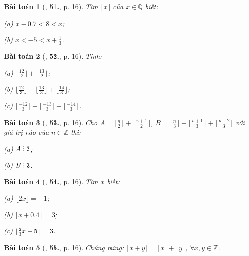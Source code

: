\documentclass{article}
\numberwithin{equation}{section}
\newtheorem{baitoan}{Bài toán}[section]
\DeclareRobustCommand{\divby}{%
	\mathrel{\vbox{\baselineskip.65ex\lineskiplimit0pt\hbox{.}\hbox{.}\hbox{.}}}%
}
\begin{document}
\begin{baitoan}[\cite{Tuyen_Toan_7}, \textbf{51.}, p. 16]
	Tìm $\lfloor x\rfloor$ của $x\in\mathbb{Q}$ biết:
	\begin{enumerate*}
		\item[(a)] $x - 0.7 < 8 < x$;
		\item[(b)] $x < -5 < x + \frac{1}{3}$.
	\end{enumerate*}
\end{baitoan}

\begin{baitoan}[\cite{Tuyen_Toan_7}, \textbf{52.}, p. 16]
	Tính:
	\begin{enumerate*}
		\item[(a)] $\lfloor\frac{12}{2}\rfloor + \lfloor\frac{13}{2}\rfloor$;
		\item[(b)] $\lfloor\frac{12}{3}\rfloor + \lfloor\frac{13}{3}\rfloor + \lfloor\frac{14}{3}\rfloor$;
		\item[(c)] $\lfloor\frac{-12}{3}\rfloor + \lfloor\frac{-13}{3}\rfloor + \lfloor\frac{-14}{3}\rfloor$.
	\end{enumerate*}
\end{baitoan}

\begin{baitoan}[\cite{Tuyen_Toan_7}, \textbf{53.}, p. 16]
	Cho $A = \lfloor\frac{n}{2}\rfloor + \lfloor\frac{n + 1}{2}\rfloor$, $B = \lfloor\frac{n}{3}\rfloor + \lfloor\frac{n + 1}{3}\rfloor + \lfloor\frac{n + 2}{3}\rfloor$ với giá trị nào của $n\in\mathbb{Z}$ thì:
	\begin{enumerate*}
		\item[(a)] $A\divby 2$;
		\item[(b)] $B\divby 3$.
	\end{enumerate*}
\end{baitoan}

\begin{baitoan}[\cite{Tuyen_Toan_7}, \textbf{54.}, p. 16]
	Tìm $x$ biết:
	\begin{enumerate*}
		\item[(a)] $\lfloor 2x\rfloor = -1$;
		\item[(b)] $\lfloor x + 0.4\rfloor = 3$;
		\item[(c)] $\lfloor\frac{2}{3}x - 5\rfloor = 3$.
	\end{enumerate*}
\end{baitoan}

\begin{baitoan}[\cite{Tuyen_Toan_7}, \textbf{55.}, p. 16]
	Chứng ming: $\lfloor x + y\rfloor = \lfloor x\rfloor + \lfloor y\rfloor$, $\forall x,y\in\mathbb{Z}$.
\end{baitoan}
\end{document}
